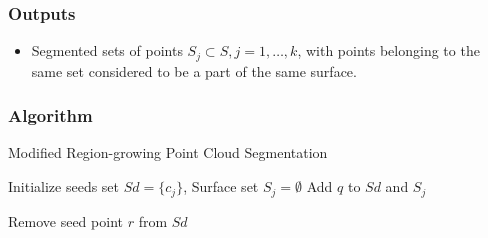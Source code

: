 \documentclass[12pt,a4paper]{article}
\begin{document}
    \subsubsection{Outputs}
    \begin{itemize}
        \itemsep0em 
        \item Segmented sets of points $S_j \subset S, j=1,\dots,k$, with points belonging to the same set considered to be a part of the same surface.
    \end{itemize}

    \subsubsection{Algorithm}
    \begin{algorithm}[H]
        \caption{Modified Region-growing Point Cloud Segmentation}
        \begin{algorithmic}
            \State Initialize seeds set $Sd = \{c_j\}$, Surface set $S_j = \emptyset$
                \State Add $q$ to $Sd$ and $S_j$
                \EndIf
                
            \EndFor
            \State Remove seed point $r$ from $Sd$
            \EndFor
            \EndFor
        \end{algorithmic}
    \end{algorithm}
    
\end{document}
